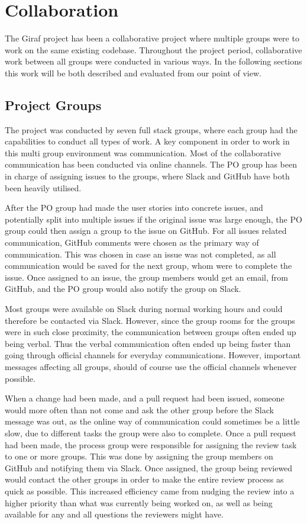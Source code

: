 \chapter{Collaboration}
The Giraf project has been a collaborative project where multiple groups were to work on the same existing codebase.
Throughout the project period, collaborative work between all groups were conducted in various ways.  
In the following sections this work will be both described and evaluated from our point of view.

\section{Project Groups}
The project was conducted by seven full stack groups, where each group had the capabilities to conduct all types of work.
A key component in order to work in this multi group environment was communication.
Most of the collaborative communication has been conducted via online channels.
The PO group has been in charge of assigning issues to the groups, where Slack and GitHub have both been heavily utilised.

After the PO group had made the user stories into concrete issues, and potentially split into multiple issues if the original issue was large enough, the PO group could then assign a group to the issue on GitHub.
For all issues related communication, GitHub comments were chosen as the primary way of communication. 
This was chosen in case an issue was not completed, as all communication would be saved for the next group, whom were to complete the issue.
Once assigned to an issue, the group members would get an email, from GitHub, and the PO group would also notify the group on Slack. 

Most groups were available on Slack during normal working hours and could therefore be contacted via Slack.
However, since the group rooms for the groups were in such close proximity, the communication between groups often ended up being verbal.
Thus the verbal communication often ended up being faster than going through official channels for everyday communications.
However, important messages affecting all groups, should of course use the official channels whenever possible.

When a change had been made, and a pull request had been issued, someone would more often than not come and ask the other group before the Slack message was out, as the online way of communication could sometimes be a little slow, due to different tasks the group were also to complete.
Once a pull request had been made, the process group were responsible for assigning the review task to one or more groups. 
This was done by assigning the group members on GitHub and notifying them via Slack. 
Once assigned, the group being reviewed would contact the other groups in order to make the entire review process as quick as possible.
This increased efficiency came from nudging the review into a higher priority than what was currently being worked on, as well as being available for any and all questions the reviewers might have.

